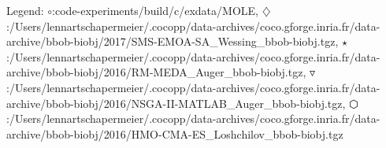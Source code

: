 Legend: {\color{NavyBlue}$\circ$}:code-experiments/build/c/exdata/MOLE, {\color{Magenta}$\diamondsuit$}:/Users/lennartschapermeier/.cocopp/data-archives/coco.gforge.inria.fr/data-archive/bbob-biobj/2017/SMS-EMOA-SA\_Wessing\_bbob-biobj.tgz, {\color{Orange}$\star$}:/Users/lennartschapermeier/.cocopp/data-archives/coco.gforge.inria.fr/data-archive/bbob-biobj/2016/RM-MEDA\_Auger\_bbob-biobj.tgz, {\color{CornflowerBlue}$\triangledown$}:/Users/lennartschapermeier/.cocopp/data-archives/coco.gforge.inria.fr/data-archive/bbob-biobj/2016/NSGA-II-MATLAB\_Auger\_bbob-biobj.tgz, {\color{red}$\varhexagon$}:/Users/lennartschapermeier/.cocopp/data-archives/coco.gforge.inria.fr/data-archive/bbob-biobj/2016/HMO-CMA-ES\_Loshchilov\_bbob-biobj.tgz
